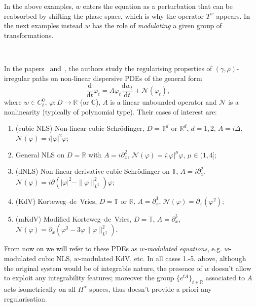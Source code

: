 \documentclass[10pt]{article}
\newcommand{\mathd}{\mathrm{d}}
\newcommand{\tmem}[1]{{\em #1\/}}
\newcommand{\tmtextit}[1]{{\itshape{#1}}}
\begin{document}
In the above examples, $w$ enters the equation as a perturbation that can be
reabsorbed by shifting the phase space, which is why the operator $T^w$
appears. In the next examples instead $w$ has the role of
\tmtextit{modulating} a given group of transformations.

\

In the papers~{\cite{choukgubinelli1}} and~{\cite{choukgubinelli2}}, the
authors study the regularising properties of $(\gamma, \rho)$\mbox{-}irregular
paths on non\mbox{-}linear dispersive PDEs of the general form
\begin{equation}
  \frac{\mathd}{\mathd t} \varphi_t = A \varphi_t  \frac{\mathd w_t}{\mathd t}
  + \mathcal{N} (\varphi_t), \label{sec6 choukgubinelli eq1}
\end{equation}
where $w \in C^0_t$, $\varphi : D \rightarrow \mathbb{R}$ (or $\mathbb{C}$),
$A$ is a linear unbounded operator and $\mathcal{N}$ is a nonlinearity
(typically of polynomial type). Their cases of interest are:
\begin{enumerate}[label=\arabic*.]
  \item (cubic NLS) Non\mbox{-}linear cubic Schr\"{o}dinger, $D =\mathbb{T}^d$
  or $\mathbb{R}^d$, $d = 1, 2$, $A = i \Delta$, $\mathcal{N} (\varphi) = i |
  \varphi |^2 \varphi$;
  
  \item General NLS on $D =\mathbb{R}$ with $A = i \partial_x^2$, $\mathcal{}
  \mathcal{N} (\varphi) = i | \varphi |^{\mu} \varphi$, $\mu \in (1, 4]$;
  
  \item (dNLS) Non\mbox{-}linear derivative cubic Schr\"{o}dinger on
  $\mathbb{T}$, $A = i \partial_x^2$, $\mathcal{N} (\varphi) = i \partial (|
  \varphi |^2 - \| \varphi \|_{L^2}^2) \varphi$;
  
  \item (KdV) Korteweg--de~Vries, $D =\mathbb{T}$ or $\mathbb{R}$, $A =
  \partial_x^3$, $\mathcal{N} (\varphi) = \partial_x (\varphi^2)$;
  
  \item (mKdV) Modified Korteweg--de~Vries, $D =\mathbb{T}$, $A =
  \partial_x^3$, $\mathcal{N} (\varphi) = \partial_x (\varphi^3 - 3 \varphi \|
  \varphi \|_{L^2}^2)$.
\end{enumerate}
From now on we will refer to these PDEs as {\tmem{$w$-modulated equations}},
e.g. $w$-modulated cubic NLS, $w$-modulated KdV, etc. In all cases
1.\mbox{-}5. above, although the original system would be of integrable
nature, the presence of $w$ doesn't allow to exploit any integrability
features; moreover the group $\{ e^{t A} \}_{t \in \mathbb{R}}$ associated to
$A$ acts isometrically on all $H^{\alpha}$\mbox{-}spaces, thus doesn't provide
a priori any regularisation.
\end{document}
